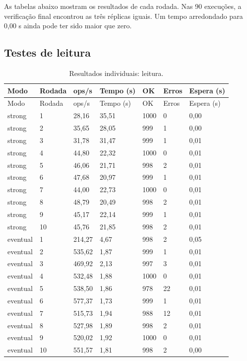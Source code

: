 As tabelas abaixo mostram os resultados de cada rodada. Nas 90 execuções, a verificação final encontrou as três réplicas iguais. Um tempo arredondado para 0,00 s ainda pode ter sido maior que zero.
\subsection{Testes de leitura}
\begingroup\small\setlength{\tabcolsep}{4pt}
\begin{longtable}{lllllll}
\caption{Resultados individuais: leitura.}\\
\toprule
Modo & Rodada & ops/s & Tempo (s) & OK & Erros & Espera (s)\\\midrule\endfirsthead
\toprule
Modo & Rodada & ops/s & Tempo (s) & OK & Erros & Espera (s)\\\midrule\endhead
\bottomrule\endfoot
strong & 1 & 28,16 & 35,51 & 1000 & 0 & 0,00\\
strong & 2 & 35,65 & 28,05 & 999 & 1 & 0,00\\
strong & 3 & 31,78 & 31,47 & 999 & 1 & 0,01\\
strong & 4 & 44,80 & 22,32 & 1000 & 0 & 0,01\\
strong & 5 & 46,06 & 21,71 & 998 & 2 & 0,01\\
strong & 6 & 47,68 & 20,97 & 999 & 1 & 0,01\\
strong & 7 & 44,00 & 22,73 & 1000 & 0 & 0,01\\
strong & 8 & 48,79 & 20,49 & 998 & 2 & 0,01\\
strong & 9 & 45,17 & 22,14 & 999 & 1 & 0,01\\
strong & 10 & 45,76 & 21,85 & 998 & 2 & 0,01\\
eventual & 1 & 214,27 & 4,67 & 998 & 2 & 0,05\\
eventual & 2 & 535,62 & 1,87 & 999 & 1 & 0,01\\
eventual & 3 & 469,92 & 2,13 & 997 & 3 & 0,01\\
eventual & 4 & 532,48 & 1,88 & 1000 & 0 & 0,01\\
eventual & 5 & 538,50 & 1,86 & 978 & 22 & 0,01\\
eventual & 6 & 577,37 & 1,73 & 999 & 1 & 0,01\\
eventual & 7 & 515,73 & 1,94 & 988 & 12 & 0,01\\
eventual & 8 & 527,98 & 1,89 & 998 & 2 & 0,01\\
eventual & 9 & 520,02 & 1,92 & 1000 & 0 & 0,01\\
eventual & 10 & 551,57 & 1,81 & 998 & 2 & 0,00\\

\end{longtable}
